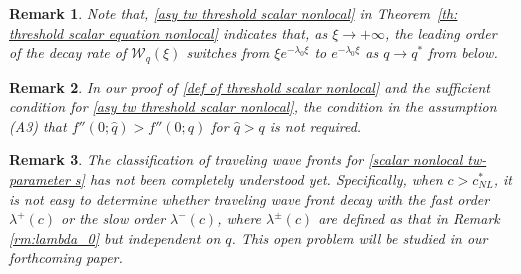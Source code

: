 \documentclass[11pt,a4paper]{article}
\newtheorem{theorem}{\textbf{Theorem}}[section]
\newtheorem{remark}[theorem]{\textbf{Remark}}
\numberwithin{equation}{section}
\numberwithin{figure}{section}
\begin{document}
\begin{remark}
Note that, \eqref{asy tw threshold scalar nonlocal} in Theorem~\ref{th: threshold scalar equation nonlocal} indicates that, as $\xi\to+\infty$, the leading order of the decay rate of $\mathcal{W}_q(\xi)$ switches from $\xi e^{-\lambda_0\xi}$ to $e^{-\lambda_0\xi}$ as $q\to q^*$ from below.
\end{remark}

\begin{remark}
In our proof of \eqref{def of threshold scalar nonlocal} and the sufficient condition for \eqref{asy tw threshold scalar nonlocal},
the condition in the assumption  (A3) that $f''(0;\hat{q})> f''(0;q)$ for $\hat{q}>q$ is not required.
\end{remark}

\begin{remark}
The classification of traveling wave fronts for \eqref{scalar nonlocal tw-parameter s} has not been completely understood yet. Specifically, when $c>c^*_{NL}$, it is not easy to determine whether traveling wave front decay with the fast order $\lambda^+(c)$ or the slow order $\lambda^-(c)$, where $\lambda^{\pm}(c)$ are defined as that in Remark \ref{rm:lambda_0} but independent on $q$. This open problem will be studied in our forthcoming paper. 
\end{remark}

\end{document}
